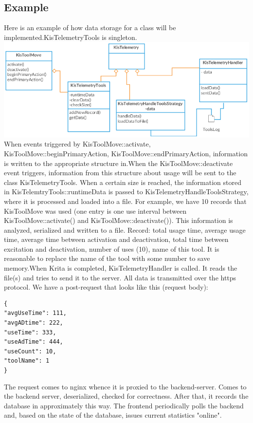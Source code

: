 \documentclass[]{article}
\begin{document}
\subsection{Example}
Here is an example of how data storage for a class will be implemented.KisTelemetryTools is singleton.\\
\includegraphics[scale=0.8]{Tools_uml4}\\
When events triggered by KisToolMove::activate, KisToolMove::beginPrimaryAction, KisToolMove::endPrimaryAction, information is written to the appropriate structure in.When the KisToolMove::deactivate event triggers, information from this structure about usage will be sent to the class KisTelemetryTools. When a certain size is reached, the information stored in KisTelemtryTools::runtimeData is passed to KisTelemetryHandleToolsStrategy, where it is processed and loaded into a file. For example, we have 10 records that KisToolMove was used (one entry is one use interval between KisToolMove::activate() and KisToolMove::deactivate()). This information is analyzed, serialized and written to a file. Record: total usage time, average usage time, average time between activation and deactivation, total time between excitation and deactivation, number of uses (10), name of this tool. It is reasonable to replace the name of the tool with some number to save memory.When Krita is completed, KisTelemetryHandler is called. It reads the file(s) and tries to send it to the server. All data is transmitted over the https protocol.
We have a post-request that looks like this (request body):
\begin{lstlisting}[language=XML]
{
"avgUseTime": 111,
"avgADtime": 222,
"useTime": 333,
"useAdTime": 444,
"useCount": 10,
"toolName": 1
}
\end{lstlisting} 
The request comes to nginx whence it is proxied to the backend-server. Comes to the backend server, deserialized, checked for correctness. After that, it records the database in approximately this way. The frontend periodically polls the backend and, based on the state of the database, issues current statistics "online".
\end{document}
